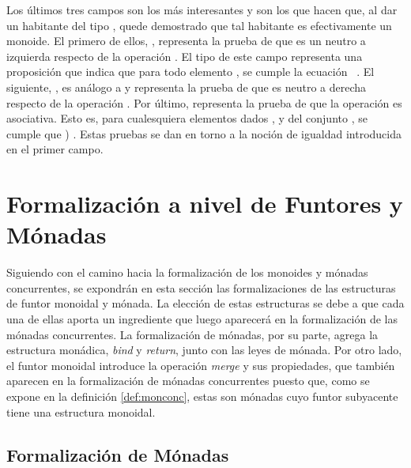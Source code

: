 Los últimos tres campos son los más interesantes y son los que hacen que, al dar un habitante del tipo , quede demostrado que tal habitante es efectivamente un monoide. El primero de ellos, , representa la prueba de que  es un neutro a izquierda respecto de la operación . El tipo de este campo representa una proposición que indica que para todo elemento , se cumple la ecuación \hbox{\AgdaSymbol{(}  \AgdaSymbol{)}  }. El siguiente, , es análogo a  y representa la prueba de que  es neutro a derecha respecto de la operación . Por último,  representa la prueba de que la operación  es asociativa. Esto es, para cualesquiera elementos dados ,  y  del conjunto , se cumple que \AgdaSymbol{(}  \AgdaSymbol{(}  \AgdaSymbol{))}  \AgdaSymbol{((}  \AgdaSymbol)  \AgdaSymbol{)}. Estas pruebas se dan en torno a la noción de igualdad introducida en el primer campo.

\section{Formalización a nivel de Funtores y Mónadas}\label{form:funtmon}

Siguiendo con el camino hacia la formalización de los monoides y mónadas concurrentes, se expondrán en esta sección las formalizaciones de las estructuras de funtor monoidal y mónada. La elección de estas estructuras se debe a que cada una de ellas aporta un ingrediente que luego aparecerá en la formalización de las mónadas concurrentes. La formalización de mónadas, por su parte, agrega la estructura monádica, \textit{bind} y \textit{return}, junto con las leyes de mónada. Por otro lado, el funtor monoidal introduce la operación \textit{merge} y sus propiedades, que también aparecen en la formalización de mónadas concurrentes puesto que, como se expone en la definición \ref{def:monconc}, estas son mónadas cuyo funtor subyacente tiene una estructura monoidal.

\subsection{Formalización de Mónadas}\label{funtmon:mon}

